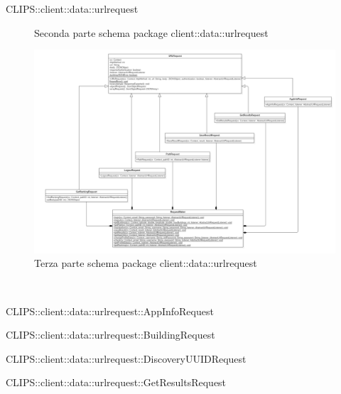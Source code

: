 \begin{componente}{CLIPS::client::data::urlrequest}
\begin{figure}[h!]
 	\caption{Seconda parte schema package client::data::urlrequest}
 \end{figure}
 \begin{figure}[h!]
 	\centering
 	\includegraphics[scale=0.35]{img/package/png/client--urlrequest3.png}
 	\caption{Terza parte schema package client::data::urlrequest}
 \end{figure}
\begin{compClassi} \\
\begin{classe}{CLIPS::client::data::urlrequest::AppInfoRequest}
\end{classe}\begin{classe}{CLIPS::client::data::urlrequest::BuildingRequest}
\end{classe}\begin{classe}{CLIPS::client::data::urlrequest::DiscoveryUUIDRequest}
\end{classe}\begin{classe}{CLIPS::client::data::urlrequest::GetResultsRequest}

\end{classe}
\end{compClassi}
\end{componente}
